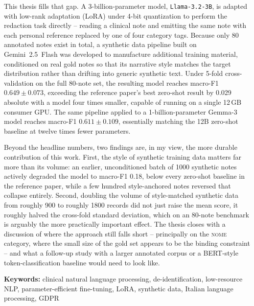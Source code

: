 \documentclass[12pt,a4paper]{report}
\newcommand{\NOME}{\textsc{nome}}
\begin{document}
This thesis fills that gap. A 3-billion-parameter model, \texttt{Llama-3.2-3B}, is adapted with low-rank adaptation (LoRA) under 4-bit quantization to perform the redaction task directly -- reading a clinical note and emitting the same note with each personal reference replaced by one of four category tags. Because only 80 annotated notes exist in total, a synthetic data pipeline built on Gemini~2.5~Flash was developed to manufacture additional training material, conditioned on real gold notes so that its narrative style matches the target distribution rather than drifting into generic synthetic text. Under 5-fold cross-validation on the full 80-note set, the resulting model reaches macro-F1 $0.649 \pm 0.073$, exceeding the reference paper's best zero-shot result by 0.029 absolute with a model four times smaller, capable of running on a single 12\,GB consumer GPU. The same pipeline applied to a 1-billion-parameter Gemma-3 model reaches macro-F1 $0.611 \pm 0.109$, essentially matching the 12B zero-shot baseline at twelve times fewer parameters.

Beyond the headline numbers, two findings are, in my view, the more durable contribution of this work. First, the style of synthetic training data matters far more than its volume: an earlier, unconditioned batch of 1000 synthetic notes actively degraded the model to macro-F1 0.18, below every zero-shot baseline in the reference paper, while a few hundred style-anchored notes reversed that collapse entirely. Second, doubling the volume of style-matched synthetic data from roughly 900 to roughly 1800 records did not just raise the mean score, it roughly halved the cross-fold standard deviation, which on an 80-note benchmark is arguably the more practically important effect. The thesis closes with a discussion of where the approach still falls short -- principally on the \NOME{} category, where the small size of the gold set appears to be the binding constraint -- and what a follow-up study with a larger annotated corpus or a BERT-style token-classification baseline would need to look like.

\vspace{1cm}
\noindent\textbf{Keywords:} clinical natural language processing, de-identification, low-resource NLP, parameter-efficient fine-tuning, LoRA, synthetic data, Italian language processing, GDPR

\newpage

\end{document}
